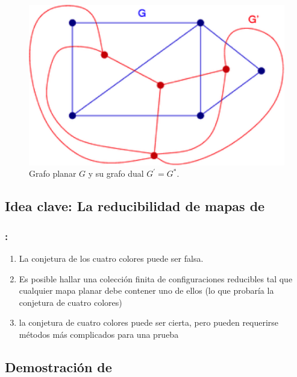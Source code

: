 \documentclass[spanish,utf8]{beamer}
\theoremstyle{definition}
\begin{document}
\begin{frame}[allowframebreaks]
\begin{figure}[H]
	\captionsetup{justification=centering,margin=0.5cm}
	\centering
	\includegraphics{example3.png}
	\caption{Grafo planar $G$ y	su grafo dual $G^{\prime}=G^{\ast}$.}
\end{figure}

\end{frame}

\subsection{Idea clave: La reducibilidad de mapas de \citeauthor{birkhoff}}

\begin{frame}
\frametitle{\insertsection:\insertsubsection}
\begin{theorem}
\begin{enumerate}
	\item La conjetura de los cuatro colores puede ser falsa.
	
	\item Es posible hallar una colección finita de configuraciones reducibles tal que cualquier mapa planar debe contener uno de ellos (lo que probaría la conjetura de cuatro colores)
	
	\item la conjetura de cuatro colores puede ser cierta, pero pueden requerirse métodos más complicados para una prueba
\end{enumerate}
\end{theorem}
\end{frame}

\subsection{Demostración de \citeauthor{appel}}
\end{document}
